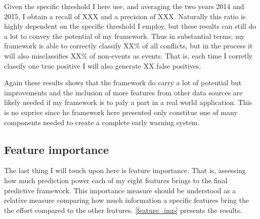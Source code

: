 \documentclass[a4paper]{article}
\begin{document}
Given the specific threshold I here use, and averaging the two years 2014 and 2015, I obtain a recall of XXX and a precision of XXX. Naturally this ratio is highly dependent on the specific threshold I employ, but these results can still do a lot to convey the potential of my framework. Thus in substantial terms; my framework is able to correctly classify XX\% of all conflicts, but in the process it will also misclassifies XX\% of non-events as events. That is, each time I corretly classify one true positive I will also generate XX false positives. 

Again these results shows that the framework do carry a lot of potential but improvements and the inclusion of more features from other data sources are likely needed if my framework is to paly a part in a real world application. This is no suprice since he framework here presented only constitue one of many components needed to create a complete early warning system.\par


\subsection{Feature importance}

The last thing I will touch upon here is feature importance. That is, assessing how much prediction power each of my eight features brings to the final predictive framework. This importance measure should be understood as a relative measure comparing how much information a specific features bring the the effort compared to the other features. \autoref{feature_imp} presents the results.\par 

\end{document}
